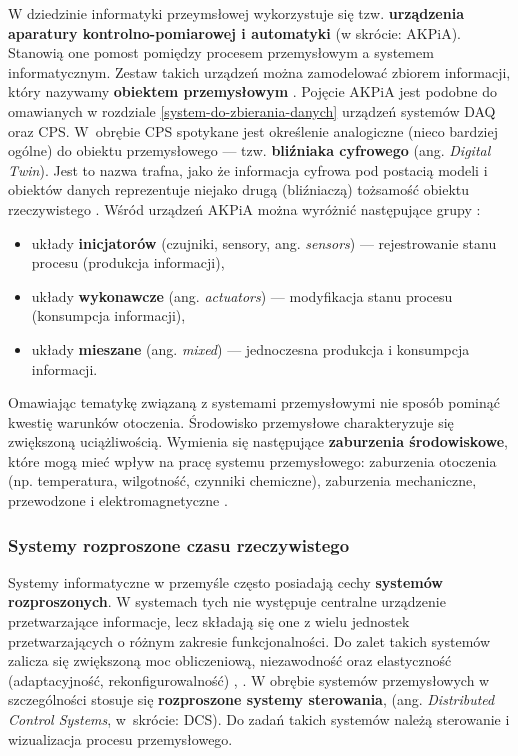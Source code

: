 \documentclass[a4paper, 12pt, twoside]{article}
\begin{document}
W dziedzinie informatyki przeymsłowej wykorzystuje się tzw.
\textbf{urządzenia aparatury kontrolno-pomiarowej i automatyki} (w skrócie: AKPiA). 
Stanowią one pomost pomiędzy procesem przemysłowym a systemem informatycznym. 
Zestaw takich urządzeń można zamodelować zbiorem informacji, który nazywamy
\textbf{obiektem przemysłowym} \cite{isp}. Pojęcie AKPiA jest podobne do omawianych
w rozdziale \ref{system-do-zbierania-danych} urządzeń systemów DAQ oraz CPS. W~obrębie
CPS spotykane jest określenie analogiczne (nieco bardziej ogólne) do obiektu przemysłowego --- 
tzw. \textbf{bliźniaka cyfrowego} (ang. \emph{Digital Twin}). 
Jest to nazwa trafna, jako że informacja cyfrowa pod postacią modeli i obiektów
danych reprezentuje niejako drugą (bliźniaczą) tożsamość obiektu rzeczywistego 
\cite{iiot-challenges-opportunities-directions}. 
Wśród urządzeń AKPiA można wyróżnić następujące grupy \cite{isp}:
\begin{itemize}
    \itemsep0em 
    \item układy \textbf{inicjatorów} (czujniki, sensory, ang. \emph{sensors}) --- rejestrowanie stanu procesu (produkcja informacji),
    \item układy \textbf{wykonawcze} (ang. \emph{actuators}) --- modyfikacja stanu procesu (konsumpcja informacji),
    \item układy \textbf{mieszane} (ang. \emph{mixed}) --- jednoczesna produkcja i konsumpcja informacji.
\end{itemize}

Omawiając tematykę związaną z systemami przemysłowymi nie sposób pominąć kwestię
warunków otoczenia. Środowisko przemysłowe charakteryzuje się zwiększoną uciążliwością.
Wymienia się następujące \textbf{zaburzenia środowiskowe}, które mogą mieć wpływ na pracę
systemu przemysłowego: zaburzenia otoczenia (np. temperatura, wilgotność, czynniki chemiczne),
zaburzenia mechaniczne, przewodzone i elektromagnetyczne \cite{isp}.

\subsubsection{Systemy rozproszone czasu rzeczywistego}

Systemy informatyczne w przemyśle często posiadają cechy \textbf{systemów rozproszonych}.
W systemach tych nie występuje centralne urządzenie
przetwarzające informacje, lecz składają się one z wielu jednostek
przetwarzających o różnym zakresie funkcjonalności. Do zalet
takich systemów zalicza się zwiększoną moc obliczeniową, niezawodność oraz 
elastyczność (adaptacyjność, rekonfigurowalność)
\cite{isp},
\cite{isp-analiza-przepływu-informacji}. W obrębie systemów przemysłowych
w szczególności stosuje się \textbf{rozproszone systemy sterowania}, 
(ang. \emph{Distributed Control Systems}, w~skrócie: DCS). Do zadań takich systemów
należą sterowanie i wizualizacja procesu przemysłowego. 
\end{document}
